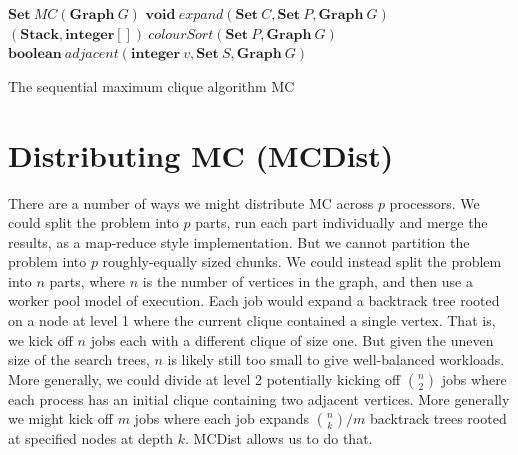 \documentclass{l4proj}
\begin{document}
\begin{algorithm}
\DontPrintSemicolon
\nl $\textbf{Set} ~ MC(\textbf{Graph} ~ G)$ \;
\nl {}
\;
\nl $\textbf{void}~expand(\textbf{Set}~C,\textbf{Set}~P,\textbf{Graph}~G)$ \;
\nl {}
\;
\nl $(\textbf{Stack},\textbf{integer} [])~colourSort(\textbf{Set}~P,\textbf{Graph}~G)$ \;
\nl {}
\;
\nl $\textbf{boolean}~adjacent(\textbf{integer}~v,\textbf{Set}~S,\textbf{Graph}~G)$ \;
\nl {}
\caption{The sequential maximum clique algorithm MC}
\label{MC}
\end{algorithm}

%
\chapter{Distributing MC (MCDist)}
\label{sec:models}
\vspace{-1.5mm}
There are a number of ways we might distribute MC across $p$ processors. We could split the problem into $p$ parts, 
run each part individually and merge the results, as a map-reduce style implementation. But we cannot partition the 
problem into $p$ roughly-equally sized chunks. We could instead split the problem into $n$ parts, where $n$ is the 
number of vertices in the graph, and then use a worker pool model of execution. Each job would expand a backtrack 
tree rooted on a node at level 1 where the current clique contained
a single vertex. That is, we kick off $n$ jobs each with a different clique of size one. 
But given the uneven size of the search trees, $n$ is likely still too small to give well-balanced workloads. More generally, 
we could divide at level 2 potentially
kicking off $n \choose 2$ jobs where each process has an initial clique containing two adjacent vertices.
More generally we might kick off $m$ jobs where each job expands ${n \choose k}/m$ backtrack trees
rooted at specified nodes at depth $k$. MCDist allows us to do that.
\end{document}
